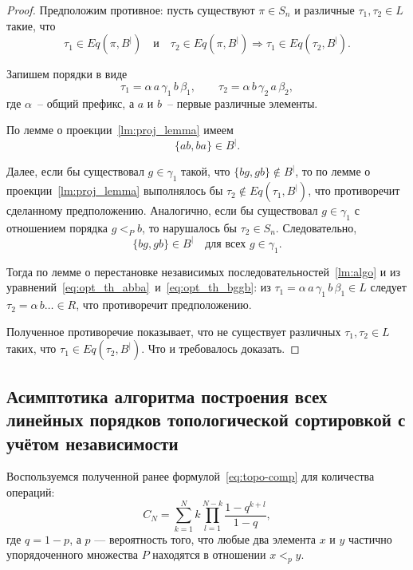 \begin{proof}
  Предположим противное: пусть существуют $\pi \in S_n$ и различные
  $\tau_1, \tau_2 \in L$ такие, что
  \[
    \tau_1 \in Eq(\pi, B^{|})
    \quad\text{и}\quad
    \tau_2 \in Eq(\pi, B^{|}) \Rightarrow \tau_1 \in Eq(\tau_2, B^{|}).
  \]

  Запишем порядки в виде
  \[
    \tau_1 = \alpha\, a\, \gamma_1\, b\, \beta_1,
    \qquad
    \tau_2 = \alpha\, b\, \gamma_2\, a\, \beta_2,
  \]
  где $\alpha$~-- общий префикс, а $a$ и $b$~-- первые различные
  элементы.

  По лемме о проекции~\ref{lm:proj_lemma} имеем
  \begin{equation}
    \{ab, ba\} \in B^{|}.
    \label{eq:opt_th_abba}
  \end{equation}

  Далее, если бы существовал $g \in \gamma_1$ такой, что
  $\{bg, gb\} \notin B^{|}$, то по лемме о
  проекции~\ref{lm:proj_lemma} выполнялось бы
  $\tau_2 \notin Eq(\tau_1, B^{|})$, что противоречит сделанному
  предположению. Аналогично, если бы существовал $g \in \gamma_1$
  с отношением порядка $g <_P b$, то нарушалось бы $\tau_2 \in S_n$.
  Следовательно,
  \begin{equation}
    \{bg, gb\} \in B^{|} \quad \text{для всех } g \in \gamma_1.
    \label{eq:opt_th_bggb}
  \end{equation}

  Тогда по лемме о перестановке независимых
  последовательностей~\ref{lm:algo} и из
  уравнений~\eqref{eq:opt_th_abba}~и~\eqref{eq:opt_th_bggb}: из
  $\tau_1 = \alpha\, a\, \gamma_1\, b\, \beta_1 \in L$ следует
  $\tau_2 = \alpha\, b \ldots \in R$, что противоречит предположению.

  Полученное противоречие показывает, что не существует различных
  $\tau_1, \tau_2 \in L$ таких, что $\tau_1 \in Eq(\tau_2, B^{|})$.
  Что и требовалось доказать.
\end{proof}

\subsection{Асимптотика алгоритма построения всех линейных порядков
топологической сортировкой с учётом независимости}
\label{sec:ch2/topoalg-indep-comp}

Воспользуемся полученной ранее формулой~\ref{eq:topo-comp} для количества
операций:
\[
  C_N = \sum_{k=1}^{N} k \prod_{l=1}^{N-k} \frac{1-q^{k+l}}{1-q},
\]
где $q = 1 - p$, а $p$ — вероятность того, что любые два элемента $x$
и $y$ частично упорядоченного множества $P$ находятся в
отношении $x <_p y$.

